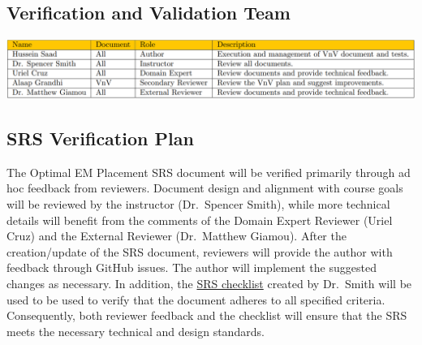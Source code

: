 \documentclass[12pt, titlepage]{article}
\begin{document}
\subsection{Verification and Validation Team} \label{team}
\begin{center}
  \includegraphics[scale=0.36]{VnVTeam.PNG} \label{team_table}
\end{center}

\subsection{SRS Verification Plan}
The Optimal EM Placement SRS document will be verified primarily through ad hoc feedback from reviewers. Document design and alignment with course goals will be reviewed by the instructor (Dr.~Spencer Smith), while more technical details will benefit from the comments of the Domain Expert Reviewer (Uriel Cruz) and the External Reviewer (Dr.~Matthew Giamou). After the creation/update of the SRS document, reviewers will provide the author with feedback through GitHub issues. The author will implement the suggested changes as necessary. In addition, the \href{https://github.com/husseinsd1/optimal-em-arrangement/blob/main/docs/Checklists/SRS-Checklist.pdf}{SRS checklist} created by Dr.~Smith will be used to be used to verify that the document adheres to all specified criteria. Consequently, both reviewer feedback and the checklist will ensure that the SRS meets the necessary technical and design standards.
\end{document}
